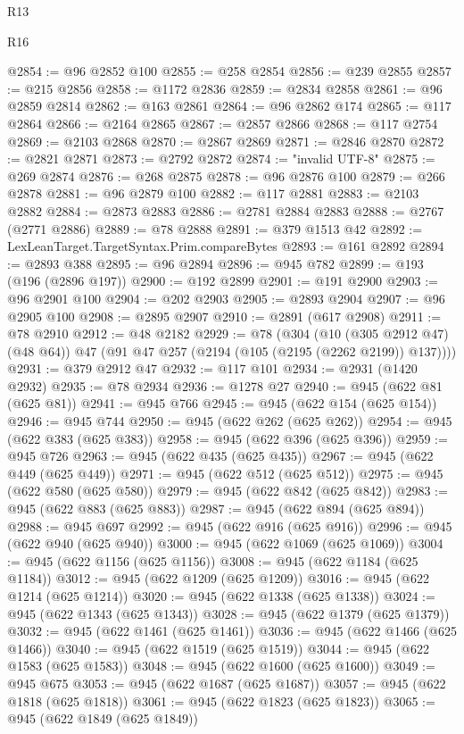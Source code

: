 \begin{lexlean}{R13}
\begin{lexlean}{R16}
\begin{coremodule}
{{{{{{{{{{{{{{{{{{{{{{{{{{{{{{{{{{{{{{{{{{{{{{{{{{{{{{{{{{{{{{{{{{{{{{{{{{{{{{{{{{{{{{{{{{{{{{{{{{{{{{{{{{{{{{{{{@2854 := @96 @2852 @100
@2855 := @258 @2854
@2856 := @239 @2855
@2857 := @215 @2856
@2858 := @1172 @2836
@2859 := @2834 @2858
@2861 := @96 @2859 @2814
@2862 := @163 @2861
@2864 := @96 @2862 @174
@2865 := @117 @2864
@2866 := @2164 @2865
@2867 := @2857 @2866
@2868 := @117 @2754
@2869 := @2103 @2868
@2870 := @2867 @2869
@2871 := @2846 @2870
@2872 := @2821 @2871
@2873 := @2792 @2872
@2874 := "invalid UTF-8"
@2875 := @269 @2874
@2876 := @268 @2875
@2878 := @96 @2876 @100
@2879 := @266 @2878
@2881 := @96 @2879 @100
@2882 := @117 @2881
@2883 := @2103 @2882
@2884 := @2873 @2883
@2886 := @2781 @2884 @2883
@2888 := @2767 (@2771 @2886)
@2889 := @78 @2888
@2891 := @379 @1513 @42
@2892 := LexLeanTarget.TargetSyntax.Prim.compareBytes
@2893 := @161 @2892
@2894 := @2893 @388
@2895 := @96 @2894
@2896 := @945 @782
@2899 := @193 (@196 (@2896 @197))
@2900 := @192 @2899
@2901 := @191 @2900
@2903 := @96 @2901 @100
@2904 := @202 @2903
@2905 := @2893 @2904
@2907 := @96 @2905 @100
@2908 := @2895 @2907
@2910 := @2891 (@617 @2908)
@2911 := @78 @2910
@2912 := @48 @2182
@2929 := @78
    (@304
      (@10 (@305 @2912 @47) (@48 @64))
      @47
      (@91 @47 @257 (@2194 (@105 (@2195 (@2262 @2199)) @137))))
@2931 := @379 @2912 @47
@2932 := @117 @101
@2934 := @2931 (@1420 @2932)
@2935 := @78 @2934
@2936 := @1278 @27
@2940 := @945 (@622 @81 (@625 @81))
@2941 := @945 @766
@2945 := @945 (@622 @154 (@625 @154))
@2946 := @945 @744
@2950 := @945 (@622 @262 (@625 @262))
@2954 := @945 (@622 @383 (@625 @383))
@2958 := @945 (@622 @396 (@625 @396))
@2959 := @945 @726
@2963 := @945 (@622 @435 (@625 @435))
@2967 := @945 (@622 @449 (@625 @449))
@2971 := @945 (@622 @512 (@625 @512))
@2975 := @945 (@622 @580 (@625 @580))
@2979 := @945 (@622 @842 (@625 @842))
@2983 := @945 (@622 @883 (@625 @883))
@2987 := @945 (@622 @894 (@625 @894))
@2988 := @945 @697
@2992 := @945 (@622 @916 (@625 @916))
@2996 := @945 (@622 @940 (@625 @940))
@3000 := @945 (@622 @1069 (@625 @1069))
@3004 := @945 (@622 @1156 (@625 @1156))
@3008 := @945 (@622 @1184 (@625 @1184))
@3012 := @945 (@622 @1209 (@625 @1209))
@3016 := @945 (@622 @1214 (@625 @1214))
@3020 := @945 (@622 @1338 (@625 @1338))
@3024 := @945 (@622 @1343 (@625 @1343))
@3028 := @945 (@622 @1379 (@625 @1379))
@3032 := @945 (@622 @1461 (@625 @1461))
@3036 := @945 (@622 @1466 (@625 @1466))
@3040 := @945 (@622 @1519 (@625 @1519))
@3044 := @945 (@622 @1583 (@625 @1583))
@3048 := @945 (@622 @1600 (@625 @1600))
@3049 := @945 @675
@3053 := @945 (@622 @1687 (@625 @1687))
@3057 := @945 (@622 @1818 (@625 @1818))
@3061 := @945 (@622 @1823 (@625 @1823))
@3065 := @945 (@622 @1849 (@625 @1849))
}}}}}}}}}}}}}}}}}}}}}}}}}}}}}}}}}}}}}}}}}}}}}}}}}}}}}}}}}}}}}}}}}}}}}}}}}}}}}}}}}}}}}}}}}}}}}}}}}}}}}}}}}}}}}}}}}
\end{coremodule}
\end{lexlean}
\end{lexlean}
